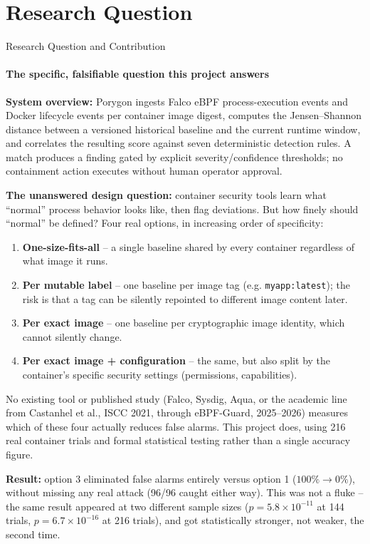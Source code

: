 \documentclass[aspectratio=169, 11pt]{beamer}
\begin{document}
\section{Research Question}
\begin{frame}{Research Question and Contribution}
\framesubtitle{The specific, falsifiable question this project answers}

\scriptsize
\textbf{System overview:} Porygon ingests Falco eBPF process-execution
events and Docker lifecycle events per container image digest, computes
the Jensen--Shannon distance between a versioned historical baseline and
the current runtime window, and correlates the resulting score against
seven deterministic detection rules. A match produces a finding gated by
explicit severity/confidence thresholds; no containment action executes
without human operator approval.

\smallskip
\textbf{The unanswered design question:} container security tools learn
what ``normal'' process behavior looks like, then flag deviations. But how
finely should ``normal'' be defined? Four real options, in increasing
order of specificity:

\begin{enumerate}
\setlength{\itemsep}{1pt}
\item \textbf{One-size-fits-all} -- a single baseline shared by every
container regardless of what image it runs.
\item \textbf{Per mutable label} -- one baseline per image tag (e.g.
\texttt{myapp:latest}); the risk is that a tag can be silently repointed to
different image content later.
\item \textbf{Per exact image} -- one baseline per cryptographic image
identity, which cannot silently change.
\item \textbf{Per exact image + configuration} -- the same, but also
split by the container's specific security settings (permissions,
capabilities).
\end{enumerate}

No existing tool or published study (Falco, Sysdig, Aqua, or the academic
line from Castanhel et al., ISCC 2021, through eBPF-Guard, 2025--2026)
measures which of these four actually reduces false alarms. This project
does, using 216 real container trials and formal statistical testing
rather than a single accuracy figure.

\smallskip
\textbf{Result:} option 3 eliminated false alarms entirely versus option 1
($100\%\to0\%$), without missing any real attack (96/96 caught either
way). This was not a fluke -- the same result appeared at two different
sample sizes ($p=5.8\times10^{-11}$ at 144 trials, $p=6.7\times10^{-16}$
at 216 trials), and got statistically stronger, not weaker, the second
time.
\end{frame}
\end{document}
